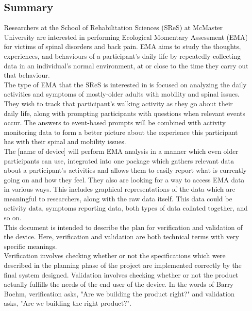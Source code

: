 \documentclass[12pt, titlepage]{article}
\begin{document}
\subsection{Summary}

Researchers at the School of Rehabilitation Sciences (SReS) at McMaster University are interested in performing Ecological Momentary Assessment (EMA) for victims of spinal disorders and back pain. EMA aims to study the thoughts, experiences, and behaviours of a participant's daily life by repeatedly collecting data in an individual's normal environment, at or close to the time they carry out that behaviour.\\

The type of EMA that the SReS is interested in is focused on analyzing the daily activities and symptoms of mostly-older adults with mobility and spinal issues. They wish to track that participant's walking activity as they go about their daily life, along with prompting participants with questions when relevant events occur. The answers to event-based prompts will be combined with activity monitoring data to form a better picture about the experience this participant has with their spinal and mobility issues.\\

The [name of device] will perform EMA analysis in a manner which even older participants can use, integrated into one package which gathers relevant data about a participant's activities and allows them to easily report what is currently going on and how they feel. They also are looking for a way to access EMA data in various ways. This includes graphical representations of the data which are meaningful to researchers, along with the raw data itself. This data could be activity data, symptoms reporting data, both types of data collated together, and so on. \\

This document is intended to describe the plan for verification and validation of the device. Here, verification and validation are both technical terms with very specific meanings.\\

Verification involves checking whether or not the specifications which were described in the planning phase of the project are implemented correctly by the final system designed. Validation involves checking whether or not the product actually fulfills the needs of the end user of the device. In the words of Barry Boehm, verification asks, "Are we building the product right?" and validation asks, "Are we building the right product?"\cite{pham_1999}.
\end{document}
